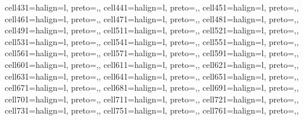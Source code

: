 \begin{table}
\begin{talltblr}
{cell{43}{1}={}{halign=l, preto={\hspace{1em}},},
cell{44}{1}={}{halign=l, preto={\hspace{1em}},},
cell{45}{1}={}{halign=l, preto={\hspace{1em}},},
cell{46}{1}={}{halign=l, preto={\hspace{1em}},},
cell{47}{1}={}{halign=l, preto={\hspace{1em}},},
cell{48}{1}={}{halign=l, preto={\hspace{1em}},},
cell{49}{1}={}{halign=l, preto={\hspace{1em}},},
cell{51}{1}={}{halign=l, preto={\hspace{1em}},},
cell{52}{1}={}{halign=l, preto={\hspace{1em}},},
cell{53}{1}={}{halign=l, preto={\hspace{1em}},},
cell{54}{1}={}{halign=l, preto={\hspace{1em}},},
cell{55}{1}={}{halign=l, preto={\hspace{1em}},},
cell{56}{1}={}{halign=l, preto={\hspace{1em}},},
cell{57}{1}={}{halign=l, preto={\hspace{1em}},},
cell{59}{1}={}{halign=l, preto={\hspace{1em}},},
cell{60}{1}={}{halign=l, preto={\hspace{1em}},},
cell{61}{1}={}{halign=l, preto={\hspace{1em}},},
cell{62}{1}={}{halign=l, preto={\hspace{1em}},},
cell{63}{1}={}{halign=l, preto={\hspace{1em}},},
cell{64}{1}={}{halign=l, preto={\hspace{1em}},},
cell{65}{1}={}{halign=l, preto={\hspace{1em}},},
cell{67}{1}={}{halign=l, preto={\hspace{1em}},},
cell{68}{1}={}{halign=l, preto={\hspace{1em}},},
cell{69}{1}={}{halign=l, preto={\hspace{1em}},},
cell{70}{1}={}{halign=l, preto={\hspace{1em}},},
cell{71}{1}={}{halign=l, preto={\hspace{1em}},},
cell{72}{1}={}{halign=l, preto={\hspace{1em}},},
cell{73}{1}={}{halign=l, preto={\hspace{1em}},},
cell{75}{1}={}{halign=l, preto={\hspace{1em}},},
cell{76}{1}={}{halign=l, preto={\hspace{1em}},},
}
\end{talltblr}
\end{table}
